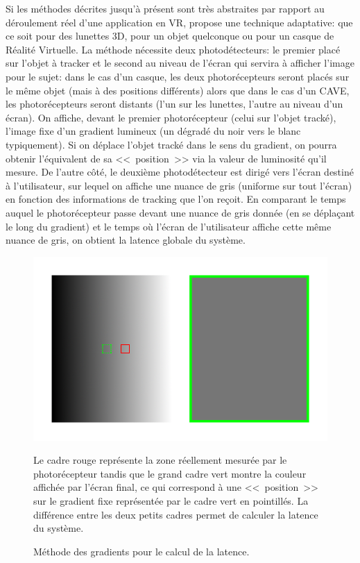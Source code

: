 	\par Si les méthodes décrites jusqu'à présent sont très abstraites par rapport au déroulement réel d'une application en VR, \citep{di_luca_new_2010} propose une technique adaptative: que ce soit pour des lunettes 3D, pour un objet quelconque ou pour un casque de Réalité Virtuelle. La méthode nécessite deux photodétecteurs: le premier placé sur l'objet à tracker et le second au niveau de l'écran qui servira à afficher l'image pour le sujet: dans le cas d'un casque, les deux photorécepteurs seront placés sur le même objet (mais à des positions différents) alors que dans le cas d'un CAVE, les photorécepteurs seront distants (l'un sur les lunettes, l'autre au niveau d'un écran). On affiche, devant le premier photorécepteur (celui sur l'objet tracké), l'image fixe d'un gradient lumineux (un dégradé du noir vers le blanc typiquement). Si on déplace l'objet tracké dans le sens du gradient, on pourra obtenir l'équivalent de sa <<~position~>> via la valeur de luminosité qu'il mesure. De l'autre côté, le deuxième photodétecteur est dirigé vers l'écran destiné à l'utilisateur, sur lequel on affiche une nuance de gris (uniforme sur tout l'écran) en fonction des informations de tracking que l'on reçoit. En comparant le temps auquel le photorécepteur passe devant une nuance de gris donnée (en se déplaçant le long du gradient) et le temps où l'écran de l'utilisateur affiche cette même nuance de gris, on obtient la latence globale du système.
	
	\begin{figure}
		\centering
		\includegraphics[scale=.5]{Figures/DiLucaGradient}
		\caption{Méthode des gradients pour le calcul de la latence.}{Le cadre rouge représente la zone réellement mesurée par le photorécepteur tandis que le grand cadre vert montre la couleur affichée par l'écran final, ce qui correspond à une <<~position~>> sur le gradient fixe représentée par le cadre vert en pointillés. La différence entre les deux petits cadres permet de calculer la latence du système.}
		\label{fig:di_luca_gradient}
	\end{figure}
	
